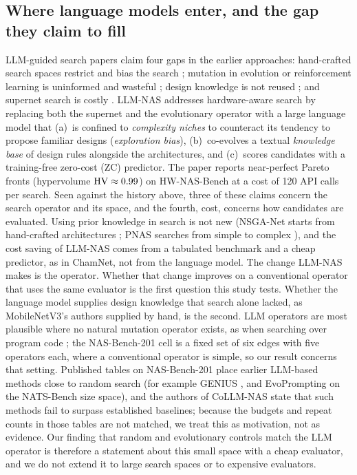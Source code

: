 \subsection{Where language models enter, and the gap they claim to fill}
LLM-guided search papers claim four gaps in the earlier approaches: hand-crafted search spaces restrict and bias the search \cite{evoprompting,llmatic}; mutation in evolution or reinforcement learning is uninformed and wasteful \cite{llmatic}; design knowledge is not reused \cite{genius,lapt}; and supernet search is costly \cite{llmnas,collmnas}. LLM-NAS \cite{llmnas} addresses hardware-aware search by replacing both the supernet and the evolutionary operator with a large language model that (a)~is confined to \emph{complexity niches} to counteract its tendency to propose familiar designs (\emph{exploration bias}), (b)~co-evolves a textual \emph{knowledge base} of design rules alongside the architectures, and (c)~scores candidates with a training-free zero-cost (ZC) predictor. The paper reports near-perfect Pareto fronts (hypervolume $\mathrm{HV}\approx0.99$) on HW-NAS-Bench at a cost of 120 API calls per search. Seen against the history above, three of these claims concern the search operator and its space, and the fourth, cost, concerns how candidates are evaluated. Using prior knowledge in search is not new (NSGA-Net starts from hand-crafted architectures \cite{nsganet}; PNAS searches from simple to complex \cite{pnas}), and the cost saving of LLM-NAS comes from a tabulated benchmark and a cheap predictor, as in ChamNet, not from the language model. The change LLM-NAS makes is the operator. Whether that change improves on a conventional operator that uses the same evaluator is the first question this study tests. Whether the language model supplies design knowledge that search alone lacked, as MobileNetV3's authors supplied by hand, is the second. LLM operators are most plausible where no natural mutation operator exists, as when searching over program code \cite{evoprompting,llmtool}; the NAS-Bench-201 cell is a fixed set of six edges with five operators each, where a conventional operator is simple, so our result concerns that setting. Published tables on NAS-Bench-201 place earlier LLM-based methods close to random search (for example GENIUS \cite{genius}, and EvoPrompting \cite{evoprompting} on the NATS-Bench size space), and the authors of CoLLM-NAS \cite{collmnas} state that such methods fail to surpass established baselines; because the budgets and repeat counts in those tables are not matched, we treat this as motivation, not as evidence. Our finding that random and evolutionary controls match the LLM operator is therefore a statement about this small space with a cheap evaluator, and we do not extend it to large search spaces or to expensive evaluators.

